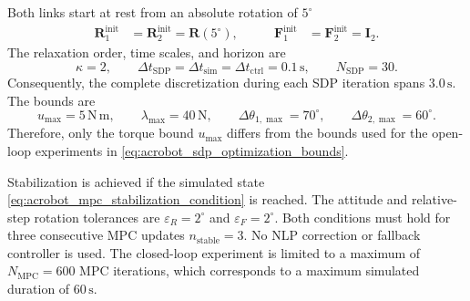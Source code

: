 Both links start at rest from an absolute rotation of $5^\circ$
\begin{equation}
\begin{aligned}
    \bm R_1^{\mathrm{init}}
    &=\bm R_2^{\mathrm{init}}=\bm R(5^\circ),
    &\qquad
    \bm F_1^{\mathrm{init}}
    &=\bm F_2^{\mathrm{init}}=\bm I_2.
\end{aligned}
\label{eq:acrobot_mpc_u5_boundary_configurations}
\end{equation}
The relaxation order, time scales, and horizon are
\begin{equation}
    \kappa=2,
    \qquad
    \Delta t_{\mathrm{SDP}}
    =\Delta t_{\mathrm{sim}}
    =\Delta t_{\mathrm{ctrl}}
    =0.1\,\mathrm{s},
    \qquad
    N_{\mathrm{SDP}}=30.
\label{eq:acrobot_mpc_u5_time_configuration}
\end{equation}
Consequently, the complete discretization during each SDP iteration spans
$3.0\,\mathrm{s}$.
The bounds are
\begin{equation}
    u_{\max}=5\,\mathrm{N\,m},
    \qquad
    \lambda_{\max}=40\,\mathrm{N},
    \qquad
    \Delta\theta_{1,\max}=70^\circ,
    \qquad
    \Delta\theta_{2,\max}=60^\circ.
\label{eq:acrobot_mpc_u5_bounds}
\end{equation}
Therefore, only the torque bound $u_{\max}$ differs from the bounds used for the open-loop
experiments in \eqref{eq:acrobot_sdp_optimization_bounds}.

Stabilization is achieved if the simulated state
\eqref{eq:acrobot_mpc_stabilization_condition} is reached. The attitude and
relative-step rotation tolerances are $\varepsilon_R=2^\circ$ and
$\varepsilon_F=2^\circ$. Both conditions must hold for
three consecutive MPC updates $n_{\mathrm{stable}}=3$. 
No NLP correction or fallback controller is used. The closed-loop experiment
is limited to a maximum of $N_{\mathrm{MPC}}=600$ MPC iterations, which corresponds
to a maximum simulated duration of $60\,\mathrm{s}$.

